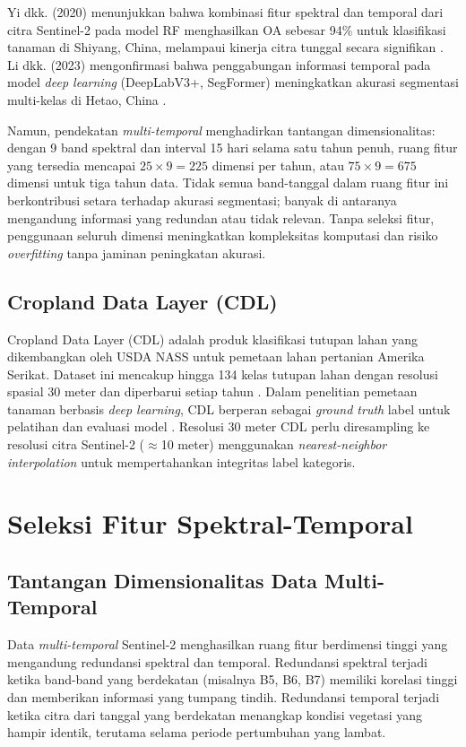 Yi dkk. (2020) menunjukkan bahwa kombinasi fitur spektral dan temporal dari citra Sentinel-2 pada model RF menghasilkan OA sebesar 94\% untuk klasifikasi tanaman di Shiyang, China, melampaui kinerja citra tunggal secara signifikan \cite{yi2020}.
Li dkk. (2023) mengonfirmasi bahwa penggabungan informasi temporal pada model \textit{deep learning} (DeepLabV3+, SegFormer) meningkatkan akurasi segmentasi multi-kelas di Hetao, China \cite{li2023}.

Namun, pendekatan \textit{multi-temporal} menghadirkan tantangan dimensionalitas: dengan 9 band spektral dan interval 15 hari selama satu tahun penuh, ruang fitur yang tersedia mencapai $25 \times 9 = 225$ dimensi per tahun, atau $75 \times 9 = 675$ dimensi untuk tiga tahun data.
Tidak semua band-tanggal dalam ruang fitur ini berkontribusi setara terhadap akurasi segmentasi; banyak di antaranya mengandung informasi yang redundan atau tidak relevan.
Tanpa seleksi fitur, penggunaan seluruh dimensi meningkatkan kompleksitas komputasi dan risiko \textit{overfitting} tanpa jaminan peningkatan akurasi.

\subsection{Cropland Data Layer (CDL)}
Cropland Data Layer (CDL) adalah produk klasifikasi tutupan lahan yang dikembangkan oleh USDA NASS untuk pemetaan lahan pertanian Amerika Serikat.
Dataset ini mencakup hingga 134 kelas tutupan lahan dengan resolusi spasial 30 meter dan diperbarui setiap tahun \cite{copenhaver2021}.
Dalam penelitian pemetaan tanaman berbasis \textit{deep learning}, CDL berperan sebagai \textit{ground truth} label untuk pelatihan dan evaluasi model \cite{tran2022, maleki2024}.
Resolusi 30 meter CDL perlu diresampling ke resolusi citra Sentinel-2 ($\approx$10 meter) menggunakan \textit{nearest-neighbor interpolation} untuk mempertahankan integritas label kategoris.

\section{Seleksi Fitur Spektral-Temporal}
\subsection{Tantangan Dimensionalitas Data Multi-Temporal}
Data \textit{multi-temporal} Sentinel-2 menghasilkan ruang fitur berdimensi tinggi yang mengandung redundansi spektral dan temporal.
Redundansi spektral terjadi ketika band-band yang berdekatan (misalnya B5, B6, B7) memiliki korelasi tinggi dan memberikan informasi yang tumpang tindih.
Redundansi temporal terjadi ketika citra dari tanggal yang berdekatan menangkap kondisi vegetasi yang hampir identik, terutama selama periode pertumbuhan yang lambat.

